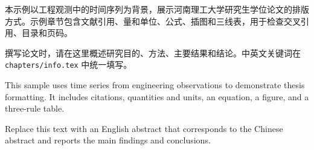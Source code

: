 本示例以工程观测中的时间序列为背景，展示河南理工大学研究生学位论文的排版方式。示例章节包含文献引用、量和单位、公式、插图和三线表，用于检查交叉引用、目录和页码。

撰写论文时，请在这里概述研究目的、方法、主要结果和结论。中英文关键词在 \texttt{chapters/info.tex} 中统一填写。
\hpuzhkeywords

This sample uses time series from engineering observations to demonstrate thesis formatting. It includes citations, quantities and units, an equation, a figure, and a three-rule table.

Replace this text with an English abstract that corresponds to the Chinese abstract and reports the main findings and conclusions.
\hpuenkeywords
